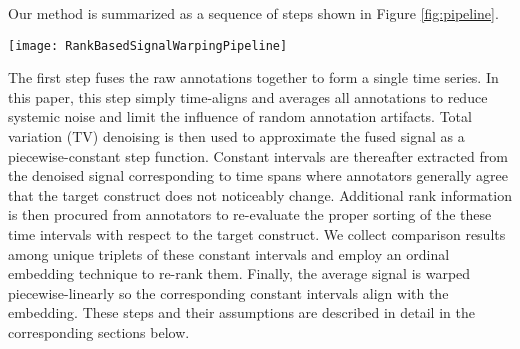 \documentclass[times,twocolumn,final,authoryear]{elsarticle}
\begin{document}
Our method is summarized as a sequence of steps shown in Figure \ref{fig:pipeline}.
\begin{figure*}[t]
	\centering
	\texttt{[image: RankBasedSignalWarpingPipeline]}
	\caption{Proposed pipeline for ground truth correction given continuous human annotations.}
	\label{fig:pipeline}
\end{figure*}
\iffalse
\begin{enumerate}
    \item Lag compensation and averaging
    \item Total variation (TV) denoising
    \item Constant interval extraction
    \item Triplet comparison collection
    \item Ordinal embedding
    \item Fused annotation warping
\end{enumerate}
\fi
The first step fuses the raw annotations together to form a single time series.  In this paper, this step simply time-aligns and averages all annotations to reduce systemic noise and limit the influence of random annotation artifacts.  Total variation (TV) denoising is then used to approximate the fused signal as a piecewise-constant step function.  Constant intervals are thereafter extracted from the denoised signal corresponding to time spans where annotators generally agree that the target construct does not noticeably change.  Additional rank information is then procured from annotators to re-evaluate the proper sorting of the these time intervals with respect to the target construct.  We collect comparison results among unique triplets of these constant intervals and employ an ordinal embedding technique to re-rank them.  Finally, the average signal is warped piecewise-linearly so the corresponding constant intervals align with the embedding.  These steps and their assumptions are described in detail in the corresponding sections below.
\end{document}
